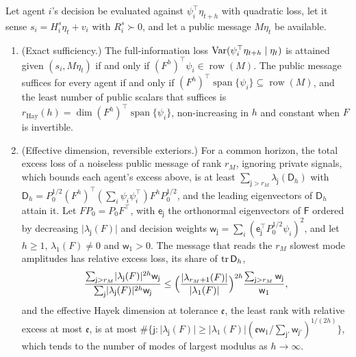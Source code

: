 \begin{theorem}\label{thm:env-hayek-horizon}
Let agent $i$'s decision be evaluated against $\psi_i^\top\eta_{t+h}$ with quadratic loss, let it sense $s_i=H^s_i\eta_t+v_i$ with $R^s_i\succ0$, and let a public message $M\eta_t$ be available.
\begin{enumerate}
\item[(a)] (Exact sufficiency.) The full-information loss $\operatorname{Var}(\psi_i^\top\eta_{t+h}\mid\eta_t)$ is attained given $(s_i,M\eta_t)$ if and only if $(F^h)^\top\psi_i\in\operatorname{row}(M)$. The public message suffices for every agent if and only if $(F^h)^\top\operatorname{span}\{\psi_i\}\subseteq\operatorname{row}(M)$, and the least number of public scalars that suffices is $r_{\mathrm{Hay}}(h)=\dim(F^h)^\top\operatorname{span}\{\psi_i\}$, non-increasing in $h$ and constant when $F$ is invertible.
\item[(b)] (Effective dimension, reversible exteriors.) For a common horizon, the total excess loss of a noiseless public message of rank $r_M$, ignoring private signals, which bounds each agent's excess above, is at least $\sum_{\mathsf j>r_M}\lambda_{\mathsf j}(\mathsf D_h)$ with $\mathsf D_h=P_0^{1/2}(F^h)^\top(\sum_i\psi_i\psi_i^\top)F^hP_0^{1/2}$, and the leading eigenvectors of $\mathsf D_h$ attain it. Let $FP_0=P_0F^\top$, with $\mathsf e_{\mathsf j}$ the orthonormal eigenvectors of $\mathsf F$ ordered by decreasing $\lvert\lambda_{\mathsf j}(F)\rvert$ and decision weights $\mathsf w_{\mathsf j}=\sum_i(\mathsf e_{\mathsf j}^\top P_0^{1/2}\psi_i)^2$, and let $h\ge1$, $\lambda_1(F)\ne0$ and $\mathsf w_1>0$. The message that reads the $r_M$ slowest mode amplitudes has relative excess loss, its share of $\operatorname{tr}\mathsf D_h$,
\[
\frac{\sum_{\mathsf j>r_M}\lvert\lambda_{\mathsf j}(F)\rvert^{2h}\mathsf w_{\mathsf j}}{\sum_{\mathsf j}\lvert\lambda_{\mathsf j}(F)\rvert^{2h}\mathsf w_{\mathsf j}}\le\Bigl(\frac{\lvert\lambda_{r_M+1}(F)\rvert}{\lvert\lambda_1(F)\rvert}\Bigr)^{2h}\frac{\sum_{\mathsf j>r_M}\mathsf w_{\mathsf j}}{\mathsf w_1},
\]
and the effective Hayek dimension at tolerance $\mathfrak e$, the least rank with relative excess at most $\mathfrak e$, is at most $\#\{\mathsf j:\lvert\lambda_{\mathsf j}(F)\rvert\ge\lvert\lambda_1(F)\rvert(\mathfrak e\mathsf w_1/\sum_{\mathsf j'}\mathsf w_{\mathsf j'})^{1/(2h)}\}$, which tends to the number of modes of largest modulus as $h\to\infty$.

\end{enumerate}
\end{theorem}
